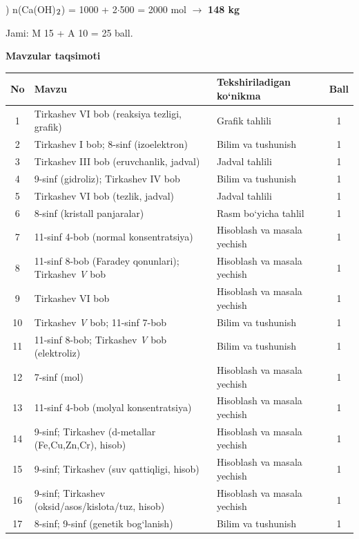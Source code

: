 \documentclass[11pt,a4paper]{article}
\renewcommand{\textsubscript}[1]{\ensuremath{_{\text{\fontsize{8}{8}\selectfont #1}}}}
\begin{document}
) n(Ca(OH)\textsubscript{2}) = 1000 + 2$\cdot$500 = 2000 mol $\to$ \textbf{148 kg}\par
\noindent Jami: M 15 + A 10 = 25 ball.\par
\par\bigskip\noindent\textbf{Mavzular taqsimoti}\par\smallskip
{\small\noindent\begin{longtable}{|c|p{7.2cm}|p{5.4cm}|c|}\hline \textbf{No} & \textbf{Mavzu} & \textbf{Tekshiriladigan ko`nikma} & \textbf{Ball}\\\hline
1 & Tirkashev VI bob (reaksiya tezligi, grafik) & Grafik tahlili & 1\\\hline
2 & Tirkashev I bob; 8-sinf (izoelektron) & Bilim va tushunish & 1\\\hline
3 & Tirkashev III bob (eruvchanlik, jadval) & Jadval tahlili & 1\\\hline
4 & 9-sinf (gidroliz); Tirkashev IV bob & Bilim va tushunish & 1\\\hline
5 & Tirkashev VI bob (tezlik, jadval) & Jadval tahlili & 1\\\hline
6 & 8-sinf (kristall panjaralar) & Rasm bo`yicha tahlil & 1\\\hline
7 & 11-sinf 4-bob (normal konsentratsiya) & Hisoblash va masala yechish & 1\\\hline
8 & 11-sinf 8-bob (Faradey qonunlari); Tirkashev \textit{V} bob & Hisoblash va masala yechish & 1\\\hline
9 & Tirkashev VI bob & Hisoblash va masala yechish & 1\\\hline
10 & Tirkashev \textit{V} bob; 11-sinf 7-bob & Bilim va tushunish & 1\\\hline
11 & 11-sinf 8-bob; Tirkashev \textit{V} bob (elektroliz) & Bilim va tushunish & 1\\\hline
12 & 7-sinf (mol) & Hisoblash va masala yechish & 1\\\hline
13 & 11-sinf 4-bob (molyal konsentratsiya) & Hisoblash va masala yechish & 1\\\hline
14 & 9-sinf; Tirkashev (d-metallar (Fe,Cu,Zn,Cr), hisob) & Hisoblash va masala yechish & 1\\\hline
15 & 9-sinf; Tirkashev (suv qattiqligi, hisob) & Hisoblash va masala yechish & 1\\\hline
16 & 9-sinf; Tirkashev (oksid/asos/kislota/tuz, hisob) & Hisoblash va masala yechish & 1\\\hline
17 & 8-sinf; 9-sinf (genetik bog`lanish) & Bilim va tushunish & 1\\\hline

\end{longtable}}
\end{document}
